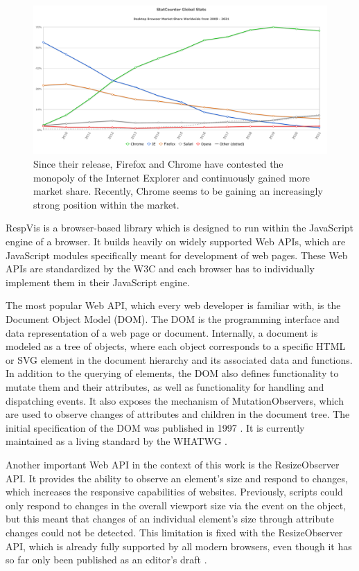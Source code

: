 \begin{figure}[tp]
\centering
\includegraphics[keepaspectratio,width=\linewidth,height=\fullh / 3]{diagrams/browser-market-share.pdf}
\caption[Desktop Browser Market Share]{
  Since their release, Firefox and Chrome have contested the monopoly of the Internet Explorer and continuously gained more market share. 
  Recently, Chrome seems to be gaining an increasingly strong position within the market. 
  }
\label{fig:BrowserMarketShare}
\end{figure}


RespVis is a browser-based library which is designed to run within the
JavaScript engine of a browser. It builds heavily on widely supported
Web APIs, which are JavaScript modules specifically meant for
development of web pages. These Web APIs are standardized by the W3C
and each browser has to individually implement them in their
JavaScript engine.

The most popular Web API, which every web developer is familiar with,
is the Document Object Model (DOM). The DOM is the programming
interface and data representation of a web page or document.
Internally, a document is modeled as a tree of objects, where each
object corresponds to a specific HTML or SVG element in the document
hierarchy and its associated data and functions. In addition to the
querying of elements, the DOM also defines functionality to mutate
them and their attributes, as well as functionality for handling and
dispatching events. It also exposes the mechanism of
MutationObservers, which are used to observe changes of
attributes and children in the document tree. The initial
specification of the DOM was published in 1997 \parencite{DOM1}. It
is currently maintained as a living standard by the WHATWG
\parencite{DOM}.

Another important Web API in the context of this work is the
ResizeObserver API. It provides the ability to observe an
element's size and respond to changes, which increases the responsive
capabilities of websites. Previously, scripts could only respond to
changes in the overall viewport size via the  event
on the  object, but this meant that changes of an
individual element's size through attribute changes could not be
detected. This limitation is fixed with the ResizeObserver
API, which is already fully supported by all modern browsers, even
though it has so far only been published as an editor's draft
\parencite{ResizeObserver}.






